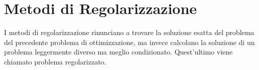 \section{Metodi di Regolarizzazione}
I metodi di regolarizzazione rinunciano a trovare la soluzione esatta del problema del 
precedente problema di ottimizzazione, ma invece calcolano la soluzione di un problema 
leggermente diverso ma meglio condizionato. Quest’ultimo viene chiamato problema regolarizzato. 
